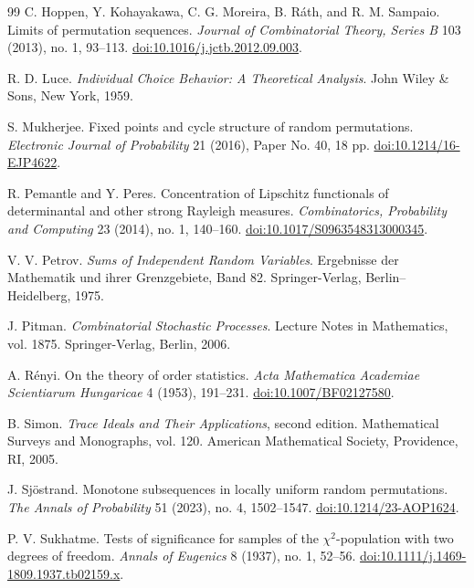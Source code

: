 \documentclass[11pt]{article}
\theoremstyle{remark}
\begin{document}
\begin{thebibliography}{99}
C. Hoppen, Y. Kohayakawa, C. G. Moreira, B. R\'ath, and R. M. Sampaio.
\newblock Limits of permutation sequences.
\newblock \emph{Journal of Combinatorial Theory, Series B} 103 (2013), no. 1,
93--113.
\newblock \href{https://doi.org/10.1016/j.jctb.2012.09.003}
{doi:10.1016/j.jctb.2012.09.003}.

R. D. Luce.
\newblock \emph{Individual Choice Behavior: A Theoretical Analysis}.
\newblock John Wiley \& Sons, New York, 1959.

S. Mukherjee.
\newblock Fixed points and cycle structure of random permutations.
\newblock \emph{Electronic Journal of Probability} 21 (2016), Paper No. 40,
18 pp.
\newblock \href{https://doi.org/10.1214/16-EJP4622}
{doi:10.1214/16-EJP4622}.

R. Pemantle and Y. Peres.
\newblock Concentration of Lipschitz functionals of determinantal and other
strong Rayleigh measures.
\newblock \emph{Combinatorics, Probability and Computing} 23 (2014), no. 1,
140--160.
\newblock \href{https://doi.org/10.1017/S0963548313000345}
{doi:10.1017/S0963548313000345}.

V. V. Petrov.
\newblock \emph{Sums of Independent Random Variables}.
\newblock Ergebnisse der Mathematik und ihrer Grenzgebiete, Band 82.
\newblock Springer-Verlag, Berlin--Heidelberg, 1975.

J. Pitman.
\newblock \emph{Combinatorial Stochastic Processes}.
\newblock Lecture Notes in Mathematics, vol. 1875.
\newblock Springer-Verlag, Berlin, 2006.

A. R\'enyi.
\newblock On the theory of order statistics.
\newblock \emph{Acta Mathematica Academiae Scientiarum Hungaricae} 4 (1953),
191--231.
\newblock \href{https://doi.org/10.1007/BF02127580}
{doi:10.1007/BF02127580}.

B. Simon.
\newblock \emph{Trace Ideals and Their Applications}, second edition.
\newblock Mathematical Surveys and Monographs, vol. 120.
\newblock American Mathematical Society, Providence, RI, 2005.

J. Sj\"ostrand.
\newblock Monotone subsequences in locally uniform random permutations.
\newblock \emph{The Annals of Probability} 51 (2023), no. 4, 1502--1547.
\newblock \href{https://doi.org/10.1214/23-AOP1624}
{doi:10.1214/23-AOP1624}.

P. V. Sukhatme.
\newblock Tests of significance for samples of the $\chi^2$-population with
two degrees of freedom.
\newblock \emph{Annals of Eugenics} 8 (1937), no. 1, 52--56.
\newblock \href{https://doi.org/10.1111/j.1469-1809.1937.tb02159.x}
{doi:10.1111/j.1469-1809.1937.tb02159.x}.

\end{thebibliography}
\end{document}
